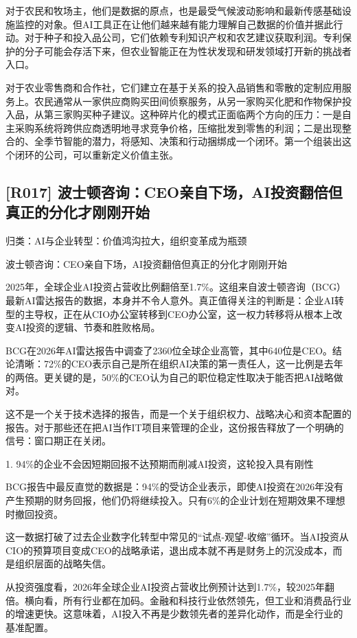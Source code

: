 \documentclass[11pt]{ctexart}
\begin{document}
对于农民和牧场主，他们是数据的原点，也是最受气候波动影响和最新传感基础设施监控的对象。但AI工具正在让他们越来越有能力理解自己数据的价值并据此行动。对于种子和投入品公司，它们依赖专利知识产权和农艺建议获取利润。专利保护的分子可能会存活下来，但农业智能正在为性状发现和研发领域打开新的挑战者入口。

对于农业零售商和合作社，它们建立在基于关系的投入品销售和零散的定制应用服务上。农民通常从一家供应商购买田间侦察服务，从另一家购买化肥和作物保护投入品，从第三家购买种子建议。这种碎片化的模式正面临两个方向的压力：一是自主采购系统将跨供应商透明地寻求竞争价格，压缩批发到零售的利润；二是出现整合的、全季节智能的潜力，将感知、决策和行动捆绑成一个闭环。第一个组装出这个闭环的公司，可以重新定义价值主张。

\subsection{[R017] 波士顿咨询：CEO亲自下场，AI投资翻倍但真正的分化才刚刚开始}
{\small\color{refgray}归类：AI与企业转型：价值鸿沟拉大，组织变革成为瓶颈}

波士顿咨询：CEO亲自下场，AI投资翻倍但真正的分化才刚刚开始

2025年，全球企业AI投资占营收比例翻倍至1.7\%。这组来自波士顿咨询（BCG）最新AI雷达报告的数据，本身并不令人意外。真正值得关注的判断是：企业AI转型的主导权，正在从CIO办公室转移到CEO办公室，这一权力转移将从根本上改变AI投资的逻辑、节奏和胜败格局。

BCG在2026年AI雷达报告中调查了2360位全球企业高管，其中640位是CEO。结论清晰：72\%的CEO表示自己是所在组织AI决策的第一责任人，这一比例是去年的两倍。更关键的是，50\%的CEO认为自己的职位稳定性取决于能否把AI战略做对。

这不是一个关于技术选择的报告，而是一个关于组织权力、战略决心和资本配置的报告。对于那些还在把AI当作IT项目来管理的企业，这份报告释放了一个明确的信号：窗口期正在关闭。

1. 94\%的企业不会因短期回报不达预期而削减AI投资，这轮投入具有刚性

BCG报告中最反直觉的数据是：94\%的受访企业表示，即使AI投资在2026年没有产生预期的财务回报，他们仍将继续投入。只有6\%的企业计划在短期效果不理想时撤回投资。

这一数据打破了过去企业数字化转型中常见的“试点-观望-收缩”循环。当AI投资从CIO的预算项目变成CEO的战略承诺，退出成本就不再是财务上的沉没成本，而是组织层面的战略失信。

从投资强度看，2026年全球企业AI投资占营收比例预计达到1.7\%，较2025年翻倍。横向看，所有行业都在加码。金融和科技行业依然领先，但工业和消费品行业的增速更快。这意味着，AI投入不再是少数领先者的差异化动作，而是全行业的基准配置。
\end{document}
